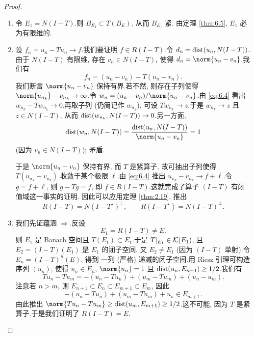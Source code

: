 \begin{proof}
\begin{enumerate}[label=(\alph*), leftmargin=2.2em, itemsep=0.3em]
	\item 令 $E_1=N(I-T)$.则 $B_{E_1}\subset T(B_E)$, 从而 $B_{E_1}$ 紧.
	      由定理  \ref{thm:6.5}, $E_1$ 必为有限维的.
	\item 设 $f_n=u_n-Tu_n\to f$.我们要证明 $f\in R(I-T)$.令
	      $d_n=\operatorname{dist}(u_n,N(I-T))$.由于 $N(I-T)$ 有限维, 存在
	      $v_n\in N(I-T)$, 使得 $d_n=\norm{u_n-v_n}$.我们有
	      \begin{equation}
	      f_n=(u_n-v_n)-T(u_n-v_n).
	      \label{eq:6.4}
	      \end{equation}
	      我们断言 $\norm{u_n-v_n}$ 保持有界.若不然, 则存在子列使得
	      $\norm{u_{n_k}}-v_{n_k}\to\infty$.令
	      $w_n=(u_n-v_n)/\norm{u_n-v_n}$.由 \eqref{eq:6.4} 看出
	      $w_{n_k}-Tw_{n_k}\to0$.再取子列 (仍简记作 $w_{n_k}$), 可设
	      $Tw_{n_k}\to z$.于是 $w_{n_k}\to z$ 且 $z\in N(I-T)$, 从而
	      $\operatorname{dist}(w_{n_k},N(I-T))\to0$.另一方面,
	      \begin{equation*}
	      \dist(w_n,N(I-T))
	      =\frac{\dist(u_n,N(I-T))}{\norm{u_n-v_n}}=1
	      \end{equation*}
	      (因为 $v_n\in N(I-T)$); 矛盾.

	      于是 $\norm{u_n-v_n}$ 保持有界, 而 $T$ 是紧算子, 故可抽出子列使得
	      $T(u_{n_k}-v_{n_k})$ 收敛于某个极限 $\ell$.由 \eqref{eq:6.4}
	      推出 $u_{n_k}-v_{n_k}\to f+\ell$.令 $g=f+\ell$, 则 $g-Tg=f$,
	      即 $f\in R(I-T)$.这就完成了算子 $(I-T)$ 有闭值域这一事实的证明.
	      因此可以应用定理  \ref{thm:2.19}, 推出
	      \begin{equation*}
	      R(I-T)=N(I-T^\star)^\perp,\qquad
	      R(I-T^\star)=N(I-T)^\perp.
	      \end{equation*}
	\item 我们先证蕴涵 $\Rightarrow$.反设
	      \begin{equation*}
	      E_1=R(I-T)\ne E.
	      \end{equation*}
	      则 $E_1$ 是 Banach 空间且 $T(E_1)\subset E_1$.于是
	      $T|_{E_1}\in\mathcal{K}(E_1)$, 且 $E_2=(I-T)(E_1)$ 是 $E_1$ 的闭子空间.
	      又 $E_2\ne E_1$ (因为 $(I-T)$ 单射).令 $E_n=(I-T)^n(E)$, 得到
	      一列 (严格) 递减的闭子空间.用 Riesz 引理可构造序列 $(u_n)$, 使得
	      $u_n\in E_n$, $\norm{u_n}=1$ 且 $\operatorname{dist}(u_n,E_{n+1})\ge1/2$.我们有
	      \begin{equation*}
	      Tu_n-Tu_m=-(u_n-Tu_n)+(u_m-Tu_m)+(u_n-u_m).
	      \end{equation*}
	      注意若 $n>m$, 则 $E_{n+1}\subset E_n\subset E_{m+1}\subset E_m$,
	      因此
	      \begin{equation*}
	      -(u_n-Tu_n)+(u_m-Tu_m)+u_n\in E_{m+1}.
	      \end{equation*}
	      由此推出 $\norm{Tu_n-Tu_m}\ge\dist(u_m,E_{m+1})\ge1/2$.这不可能,
	      因为 $T$ 是紧算子.于是我们证明了 $R(I-T)=E$.


\end{enumerate}
\end{proof}
